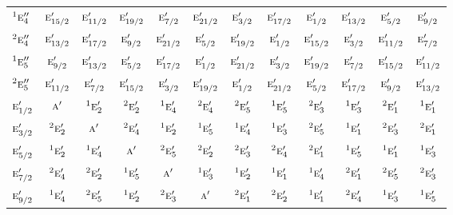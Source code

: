 \documentclass[10pt,a4paper]{article}
\numberwithin{equation}{section}
\newcommand{\irr}[1]{\text{\normalfont\scshape #1}}
\newcommand{\conjpair}[1]{{}^{#1}}
\begin{document}
{\begin{longtable}{@{}lccccccccccc@{}}
$\conjpair{1}\irr{e}_{4}''$ & $\irr{e}_{15/2}'$ & $\irr{e}_{11/2}'$ & $\irr{e}_{19/2}'$ & $\irr{e}_{7/2}'$ & $\irr{e}_{21/2}'$ & $\irr{e}_{3/2}'$ & $\irr{e}_{17/2}'$ & $\irr{e}_{1/2}'$ & $\irr{e}_{13/2}'$ & $\irr{e}_{5/2}'$ & $\irr{e}_{9/2}'$\\
$\conjpair{2}\irr{e}_{4}''$ & $\irr{e}_{13/2}'$ & $\irr{e}_{17/2}'$ & $\irr{e}_{9/2}'$ & $\irr{e}_{21/2}'$ & $\irr{e}_{5/2}'$ & $\irr{e}_{19/2}'$ & $\irr{e}_{1/2}'$ & $\irr{e}_{15/2}'$ & $\irr{e}_{3/2}'$ & $\irr{e}_{11/2}'$ & $\irr{e}_{7/2}'$\\
$\conjpair{1}\irr{e}_{5}''$ & $\irr{e}_{9/2}'$ & $\irr{e}_{13/2}'$ & $\irr{e}_{5/2}'$ & $\irr{e}_{17/2}'$ & $\irr{e}_{1/2}'$ & $\irr{e}_{21/2}'$ & $\irr{e}_{3/2}'$ & $\irr{e}_{19/2}'$ & $\irr{e}_{7/2}'$ & $\irr{e}_{15/2}'$ & $\irr{e}_{11/2}'$\\
$\conjpair{2}\irr{e}_{5}''$ & $\irr{e}_{11/2}'$ & $\irr{e}_{7/2}'$ & $\irr{e}_{15/2}'$ & $\irr{e}_{3/2}'$ & $\irr{e}_{19/2}'$ & $\irr{e}_{1/2}'$ & $\irr{e}_{21/2}'$ & $\irr{e}_{5/2}'$ & $\irr{e}_{17/2}'$ & $\irr{e}_{9/2}'$ & $\irr{e}_{13/2}'$\\
$\irr{e}_{1/2}'$ & $\irr{a}'$ & $\conjpair{1}\irr{e}_{2}'$ & $\conjpair{2}\irr{e}_{2}'$ & $\conjpair{1}\irr{e}_{4}'$ & $\conjpair{2}\irr{e}_{4}'$ & $\conjpair{2}\irr{e}_{5}'$ & $\conjpair{1}\irr{e}_{5}'$ & $\conjpair{2}\irr{e}_{3}'$ & $\conjpair{1}\irr{e}_{3}'$ & $\conjpair{2}\irr{e}_{1}'$ & $\conjpair{1}\irr{e}_{1}'$\\
$\irr{e}_{3/2}'$ & $\conjpair{2}\irr{e}_{2}'$ & $\irr{a}'$ & $\conjpair{2}\irr{e}_{4}'$ & $\conjpair{1}\irr{e}_{2}'$ & $\conjpair{1}\irr{e}_{5}'$ & $\conjpair{1}\irr{e}_{4}'$ & $\conjpair{1}\irr{e}_{3}'$ & $\conjpair{2}\irr{e}_{5}'$ & $\conjpair{1}\irr{e}_{1}'$ & $\conjpair{2}\irr{e}_{3}'$ & $\conjpair{2}\irr{e}_{1}'$\\
$\irr{e}_{5/2}'$ & $\conjpair{1}\irr{e}_{2}'$ & $\conjpair{1}\irr{e}_{4}'$ & $\irr{a}'$ & $\conjpair{2}\irr{e}_{5}'$ & $\conjpair{2}\irr{e}_{2}'$ & $\conjpair{2}\irr{e}_{3}'$ & $\conjpair{2}\irr{e}_{4}'$ & $\conjpair{2}\irr{e}_{1}'$ & $\conjpair{1}\irr{e}_{5}'$ & $\conjpair{1}\irr{e}_{1}'$ & $\conjpair{1}\irr{e}_{3}'$\\
$\irr{e}_{7/2}'$ & $\conjpair{2}\irr{e}_{4}'$ & $\conjpair{2}\irr{e}_{2}'$ & $\conjpair{1}\irr{e}_{5}'$ & $\irr{a}'$ & $\conjpair{1}\irr{e}_{3}'$ & $\conjpair{1}\irr{e}_{2}'$ & $\conjpair{1}\irr{e}_{1}'$ & $\conjpair{1}\irr{e}_{4}'$ & $\conjpair{2}\irr{e}_{1}'$ & $\conjpair{2}\irr{e}_{5}'$ & $\conjpair{2}\irr{e}_{3}'$\\
$\irr{e}_{9/2}'$ & $\conjpair{1}\irr{e}_{4}'$ & $\conjpair{2}\irr{e}_{5}'$ & $\conjpair{1}\irr{e}_{2}'$ & $\conjpair{2}\irr{e}_{3}'$ & $\irr{a}'$ & $\conjpair{2}\irr{e}_{1}'$ & $\conjpair{2}\irr{e}_{2}'$ & $\conjpair{1}\irr{e}_{1}'$ & $\conjpair{2}\irr{e}_{4}'$ & $\conjpair{1}\irr{e}_{3}'$ & $\conjpair{1}\irr{e}_{5}'$\\

\end{longtable}}
\end{document}
